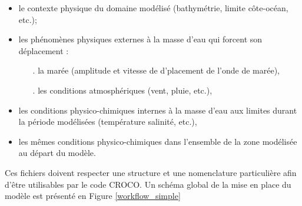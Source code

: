 \documentclass[10pt,a4paper,titlepage]{article}
\begin{document}
\begin{itemize}
    \item le contexte physique du domaine modélisé (bathymétrie, limite côte-océan, etc.);
    \item les phénomènes physiques externes à la masse d'eau qui forcent son déplacement :
    \begin{itemize}
    	\item[.] la marée (amplitude et vitesse de d'placement de l'onde de marée),
    	\item[.] les conditions atmosphériques (vent, pluie, etc.),
    \end{itemize}
    \item les conditions physico-chimiques internes à la masse d'eau aux limites durant la période modélisées (température salinité, etc.),
    \item les mêmes conditions physico-chimiques dans l'ensemble de la zone modélisée au départ du modèle.
\end{itemize}
Ces fichiers doivent respecter une structure et une nomenclature particulière afin d'être utilisables par le code CROCO.
Un schéma global de la mise en place du modèle est présenté en Figure \ref{workflow_simple}
\end{document}
